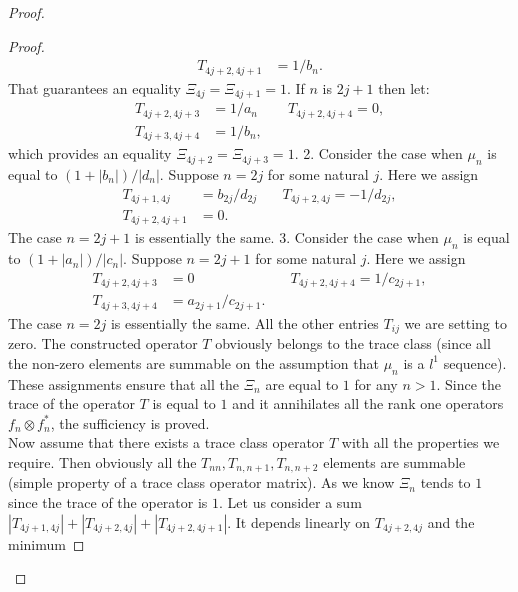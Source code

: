 \documentclass[12pt]{article}
\theoremstyle{definition}
\numberwithin{remark}{section}
\numberwithin{theorem}{section}
\numberwithin{prop}{section}
\numberwithin{equation}{section}
\numberwithin{lemma}{section}
\numberwithin{prop_under_lemma}{lemma}
\begin{document}
\begin{proof}
\begin{proof}
\begin{align*}
                T_{4j+2,4j+1}&=1/b_n.
            \end{align*}
            That guarantees an equality $\Xi_{4j} = \Xi_{4j+1} = 1$.
            If $n$ is $2j+1$ then let:
            \begin{align*}
                T_{4j+2,4j+3}&=1/a_n & \quad T_{4j+2,4j+4} = 0,\\
                T_{4j+3,4j+4}&=1/b_n,
            \end{align*}
            which provides an equality $\Xi_{4j+2} = \Xi_{4j+3} = 1$.
            2. Consider the case when $\mu_n$ is equal to $(1 + |b_n|)/|d_n|$. 
            Suppose $n = 2j$ for some natural $j$.
            Here we assign
            \begin{align*}
                T_{4j+1,4j} &= b_{2j}/d_{2j} & \quad T_{4j+2,4j} = -1/d_{2j},\\
                T_{4j+2,4j+1} &= 0.
            \end{align*}
            The case $n = 2j + 1$ is essentially the same.
            3. Consider the case when $\mu_n$ is equal to $(1 + |a_n|)/|c_n|$. 
            Suppose $n = 2j + 1$ for some natural $j$.
            Here we assign
            \begin{align*}
                T_{4j+2,4j+3} &= 0 & \quad T_{4j+2,4j+4} = 1/c_{2j+1},\\
                T_{4j+3,4j+4} &= a_{2j+1}/c_{2j+1}.
            \end{align*}
            The case $n = 2j$ is essentially the same.
            All the other entries $T_{ij}$ we are setting to zero.
            The constructed operator $T$ obviously belongs to the trace class (since all the non-zero elements are summable 
            on the assumption that $\mu_n$ is a $l^1$ sequence).
            These assignments ensure that all the $\Xi_n$ are equal to $1$ for any $n > 1$.
            Since the trace of the operator $T$ is equal to
            $1$ and it annihilates all the rank one operators $f_n \otimes f^*_n$, the sufficiency is proved.
            \medskip\\
            Now assume that there exists a trace class operator $T$ with all the properties we require.
            Then obviously all the $T_{nn}, T_{n, n+1}, T_{n, n+2}$ elements are summable (simple property of
            a trace class operator matrix).
            As we know $\Xi_n$ tends to $1$ since the trace of the operator is $1$. Let us consider a sum
            $|T_{4j+1, 4j}| + |T_{4j+2,4j}| + |T_{4j+2,4j+1}|$. It depends linearly on $T_{4j+2, 4j}$ and the minimum

\end{proof}
\end{proof}
\end{document}
